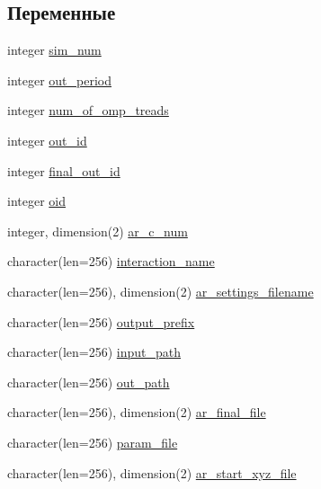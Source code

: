\subsection*{Переменные}
\begin{DoxyCompactItemize}
\item 
integer \mbox{\hyperlink{namespacefit__gr__moire_aace6796e23a47584768373466a2a7522}{sim\+\_\+num}}
\item 
integer \mbox{\hyperlink{namespacefit__gr__moire_a4a36513ac075c468e3f2c09114102f9b}{out\+\_\+period}}
\item 
integer \mbox{\hyperlink{namespacefit__gr__moire_a6b6dcf709ac2f8f7908b7d38fe795dcc}{num\+\_\+of\+\_\+omp\+\_\+treads}}
\item 
integer \mbox{\hyperlink{namespacefit__gr__moire_a877e34e1da1ed0d899e33ed675b1f0e5}{out\+\_\+id}}
\item 
integer \mbox{\hyperlink{namespacefit__gr__moire_a29fb26687189e2457138123a8a823147}{final\+\_\+out\+\_\+id}}
\item 
integer \mbox{\hyperlink{namespacefit__gr__moire_a813dce231711455b1086fcd6fd95c2a4}{oid}}
\item 
integer, dimension(2) \mbox{\hyperlink{namespacefit__gr__moire_abc1d82be5a435c0c119ec1d686f6771c}{ar\+\_\+c\+\_\+num}}
\item 
character(len=256) \mbox{\hyperlink{namespacefit__gr__moire_a7a35c12a582842134a9dac4018eddf7b}{interaction\+\_\+name}}
\item 
character(len=256), dimension(2) \mbox{\hyperlink{namespacefit__gr__moire_abe61efd3e06474bc596014a35475150c}{ar\+\_\+settings\+\_\+filename}}
\item 
character(len=256) \mbox{\hyperlink{namespacefit__gr__moire_ac107a23a93efd6c7247949001b635744}{output\+\_\+prefix}}
\item 
character(len=256) \mbox{\hyperlink{namespacefit__gr__moire_a5f4eb40eb6a559f446c1097c651da540}{input\+\_\+path}}
\item 
character(len=256) \mbox{\hyperlink{namespacefit__gr__moire_a77444985e23a0fc091f7623c2c4469b3}{out\+\_\+path}}
\item 
character(len=256), dimension(2) \mbox{\hyperlink{namespacefit__gr__moire_a1e26c6ce1c81e9f34f2f2edd4fd40ae4}{ar\+\_\+final\+\_\+file}}
\item 
character(len=256) \mbox{\hyperlink{namespacefit__gr__moire_a61b86e6a8a674b819bc9c8b166436c18}{param\+\_\+file}}
\item 
character(len=256), dimension(2) \mbox{\hyperlink{namespacefit__gr__moire_aa54f0200433f85f1399791f7128e94c5}{ar\+\_\+start\+\_\+xyz\+\_\+file}}

\end{DoxyCompactItemize}
